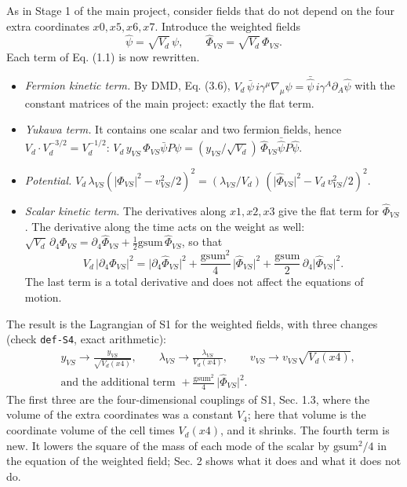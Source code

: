 \documentclass[
  10pt,
]{article}
\providecommand{\tightlist}{%
  \setlength{\itemsep}{0pt}\setlength{\parskip}{0pt}}
\begin{document}
As in Stage 1 of the main project, consider fields that do not depend on
the four extra coordinates \(x0,x5,x6,x7\). Introduce the weighted
fields
\[\hat\psi=\sqrt{V_d}\,\psi,\qquad\hat\Phi_{VS}=\sqrt{V_d}\,\Phi_{VS}.\]
Each term of Eq. (1.1) is now rewritten.

\begin{itemize}
\tightlist
\item
  \emph{Fermion kinetic term.} By DMD, Eq. (3.6),
  \(V_d\,\bar\psi\,i\gamma^\mu\nabla_\mu\psi=\bar{\hat\psi}\,i\gamma^A\partial_A\hat\psi\)
  with the constant matrices of the main project: exactly the flat term.
\item
  \emph{Yukawa term.} It contains one scalar and two fermion fields,
  hence \(V_d\cdot V_d^{-3/2}=V_d^{-1/2}\):
  \(V_d\,y_{VS}\,\Phi_{VS}\bar\psi P\psi=(y_{VS}/\sqrt{V_d})\,\hat\Phi_{VS}\bar{\hat\psi}P\hat\psi\).
\item
  \emph{Potential.}
  \(V_d\,\lambda_{VS}(\lvert\Phi_{VS}\rvert^2-v_{VS}^2/2)^2=(\lambda_{VS}/V_d)\,(\lvert\hat\Phi_{VS}\rvert^2-V_d\,v_{VS}^2/2)^2\).
\item
  \emph{Scalar kinetic term.} The derivatives along \(x1,x2,x3\) give
  the flat term for \(\hat\Phi_{VS}\). The derivative along the time
  acts on the weight as well:
  \(\sqrt{V_d}\,\partial_4\Phi_{VS}=\partial_4\hat\Phi_{VS}+\tfrac12\mathrm{gsum}\,\hat\Phi_{VS}\),
  so that
  \[V_d\,\lvert\partial_4\Phi_{VS}\rvert^2=\lvert\partial_4\hat\Phi_{VS}\rvert^2+\frac{\mathrm{gsum}^2}{4}\,\lvert\hat\Phi_{VS}\rvert^2
  +\frac{\mathrm{gsum}}{2}\,\partial_4\lvert\hat\Phi_{VS}\rvert^2 .\]
  The last term is a total derivative and does not affect the equations
  of motion.
\end{itemize}

The result is the Lagrangian of S1 for the weighted fields, with three
changes (check \texttt{def-S4}, exact arithmetic):
\[\boxed{\;\begin{aligned}&y_{VS}\to\frac{y_{VS}}{\sqrt{V_d(x4)}},\qquad\lambda_{VS}\to\frac{\lambda_{VS}}{V_d(x4)},\qquad
v_{VS}\to v_{VS}\sqrt{V_d(x4)},\\[2pt]
&\text{and the additional term }+\frac{\mathrm{gsum}^2}{4}\,\lvert\hat\Phi_{VS}\rvert^2 .\end{aligned}\;}\tag{1.2}\]
The first three are the four-dimensional couplings of S1, Sec. 1.3,
where the volume of the extra coordinates was a constant \(V_4\); here
that volume is the coordinate volume of the cell times \(V_d(x4)\), and
it shrinks. The fourth term is new. It lowers the square of the mass of
each mode of the scalar by \(\mathrm{gsum}^2/4\) in the equation of the
weighted field; Sec. 2 shows what it does and what it does not do.
\end{document}
